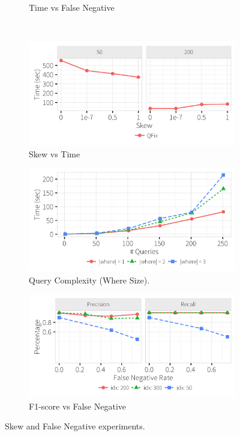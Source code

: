 \begin{figure}[h]
\begin{subfigure}[t]{.3\textwidth}
    \vspace*{-.2in}
    \caption{Time vs False Negative}
    \label{f:falsenegative_time} 
    \end{subfigure} 
    \\
    \begin{subfigure}[t]{.3\textwidth}
    \includegraphics[width = .99\columnwidth]{figures/skew_time}
    \vspace*{-.2in}
    \caption{Skew vs Time}
    \label{f:skew_time} 
    \end{subfigure}
	\begin{subfigure}[t]{.3\textwidth}
      \includegraphics[width = .99\columnwidth]{figures/where_time}
      \vspace*{-.2in}
      \caption{Query Complexity (Where Size).}
      \label{f:where_time} 
    \end{subfigure}
    \begin{subfigure}[t]{.3\textwidth}
    \includegraphics[width = .99\columnwidth]{figures/noise_fn_acc}
    \vspace*{-.2in}
    \caption{F1-score vs False Negative}
    \label{f:falsenegative_acc} 
    \end{subfigure}
    \vspace*{-.1in}
    \caption{Skew and False Negative experiments. }
  \end{figure}
